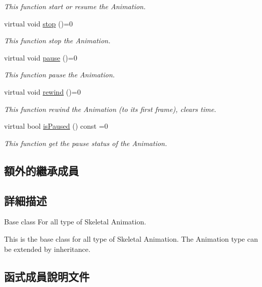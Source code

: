 \begin{DoxyCompactItemize}
\begin{DoxyCompactList}\small\item\em This function start or resume the Animation. \end{DoxyCompactList}\item 
virtual void \hyperlink{class_i_dream_sky_1_1_skeletal_anim_base_a7add9665696c4ae222231321fbd39c48}{stop} ()=0
\begin{DoxyCompactList}\small\item\em This function stop the Animation. \end{DoxyCompactList}\item 
virtual void \hyperlink{class_i_dream_sky_1_1_skeletal_anim_base_acfa9bf9e6037a83fc6f4c9bbbc03bbe1}{pause} ()=0
\begin{DoxyCompactList}\small\item\em This function pause the Animation. \end{DoxyCompactList}\item 
virtual void \hyperlink{class_i_dream_sky_1_1_skeletal_anim_base_a8e37498b115718b94072d6bf5c374a31}{rewind} ()=0
\begin{DoxyCompactList}\small\item\em This function rewind the Animation (to its first frame), clears time. \end{DoxyCompactList}\item 
virtual bool \hyperlink{class_i_dream_sky_1_1_skeletal_anim_base_abb02697b8c0a9daacbcf02026cfdf948}{is\+Paused} () const  =0
\begin{DoxyCompactList}\small\item\em This function get the pause status of the Animation. \end{DoxyCompactList}\end{DoxyCompactItemize}
\subsection*{額外的繼承成員}


\subsection{詳細描述}
Base class For all type of Skeletal Animation. 

This is the base class for all type of Skeletal Animation. The Animation type can be extended by inheritance. 

\subsection{函式成員說明文件}
